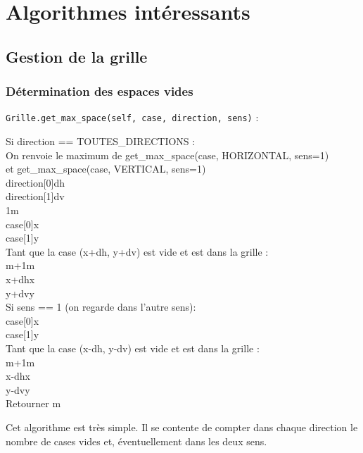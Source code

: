 \chapter{Algorithmes intéressants}

\section{Gestion de la grille}

\subsection{Détermination des espaces vides}\label{get_max_space}
\texttt{Grille.get\_max\_space(self, case, direction, sens)} :
\begin{algo1}
Si direction == TOUTES\_DIRECTIONS :\\
 On renvoie le maximum de get\_max\_space(case, HORIZONTAL, sens=1)\\
 et get\_max\_space(case, VERTICAL, sens=1)\\
direction[0]\sto dh\\
direction[1]\sto dv\\
1\sto m\\
case[0]\sto x\\
case[1]\sto y\\
Tant que la case (x+dh, y+dv) est vide et est dans la grille :\\
m+1\sto m\\
x+dh\sto x\\
y+dv\sto y\\
Si sens == 1 (on regarde dans l'autre sens):\\
case[0]\sto x\\
case[1]\sto y\\
Tant que la case (x-dh, y-dv) est vide et est dans la grille :\\
m+1\sto m\\
x-dh\sto x\\
y-dv\sto y\\
Retourner m\\
\end{algo1}

Cet algorithme est très simple. Il se contente de compter dans chaque direction le nombre de cases vides et, éventuellement dans les deux sens.

\newpage

